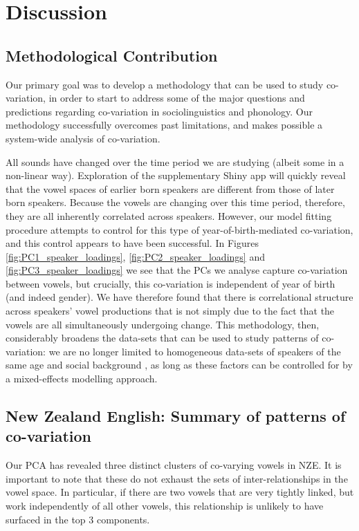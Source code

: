 \documentclass[review]{elsarticle} %
\begin{document}
\section{Discussion}

\subsection{Methodological Contribution}
Our primary goal was to develop a methodology that can be used to study co-variation, in order to start to address some of the major questions and predictions regarding co-variation in sociolinguistics and phonology. Our methodology successfully overcomes past limitations, and makes possible a system-wide analysis of co-variation.  

All sounds have changed over the time period we are studying (albeit some in a non-linear way).  Exploration of the supplementary Shiny app will quickly reveal that the vowel spaces of earlier born speakers are different from those of later born speakers.  Because the vowels are changing over this time period, therefore, they are all inherently correlated across speakers.  However, our model fitting procedure attempts to control for this type of year-of-birth-mediated co-variation, and this control appears to have been successful. In Figures \ref{fig:PC1_speaker_loadings}, \ref{fig:PC2_speaker_loadings} and \ref{fig:PC3_speaker_loadings} we see that the PCs we analyse capture co-variation between vowels, but crucially, this co-variation is independent of year of birth (and indeed gender). We have therefore found that there is correlational structure across speakers' vowel productions that is not simply due to the fact that the vowels are all simultaneously undergoing change.  This methodology, then, considerably broadens the data-sets that can be used to study patterns of co-variation: we are no longer limited to homogeneous data-sets of speakers of the same age and social background \citep{tamminga2019interspeaker}, as long as these factors can be controlled for by a mixed-effects modelling approach.

\subsection{New Zealand English: Summary of patterns of co-variation}
Our PCA has revealed three distinct clusters of co-varying vowels in NZE. It is important to note that these do not exhaust the sets of inter-relationships in the vowel space.  In particular, if there are two vowels that are very tightly linked, but work independently of all other vowels, this relationship is unlikely to have surfaced in the top 3 components.  
\end{document}
